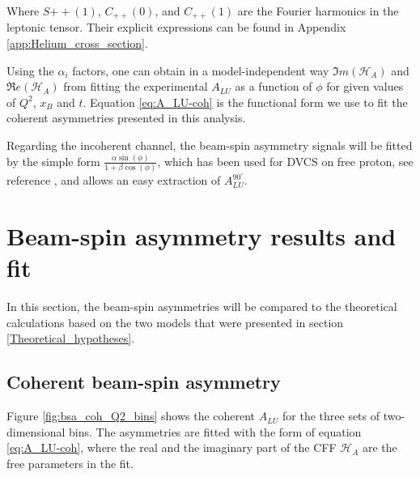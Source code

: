 Where $S{++}(1)$, $C_{++}(0)$, and $C_{++}(1)$ are the Fourier harmonics in the 
leptonic tensor. Their explicit expressions can be found in Appendix 
\ref{app:Helium_cross_section}.  

Using the $\alpha_{i}$ factors, one can obtain in a model-independent way $\Im
m(\mathcal{H}_{A})$ and $\Re e(\mathcal{H}_{A})$ from fitting the experimental 
$A_{LU}$ as a function of $\phi$ for given values of $Q^2$, $x_B$ and $t$.  
Equation \ref{eq:A_LU-coh} is the functional form we use to fit the coherent asymmetries 
presented in this analysis. 

Regarding the incoherent channel, the beam-spin 
asymmetry signals will be fitted by the simple form $\frac{\alpha \sin(\phi)}{1 + 
\beta \cos(\phi)}$, which has been used for DVCS on free proton, see reference 
\cite{FX_BSA, FX_analysis_note}, and allows an easy extraction of 
$A^{90^{\circ}}_{LU}$.  


\section{Beam-spin asymmetry results and fit}
In this section, the beam-spin asymmetries will be compared to the theoretical calculations based on the two models that were presented in section \ref{Theoretical_hypotheses}.

\subsection{Coherent beam-spin asymmetry}
Figure \ref{fig:bsa_coh_Q2_bins} shows the coherent $A_{LU}$ for the three 
sets of two-dimensional bins. The asymmetries are fitted with the form of
equation \ref{eq:A_LU-coh}, where the real and the imaginary part of the CFF 
$\mathcal{H}_{A}$ are the free parameters in the fit.

